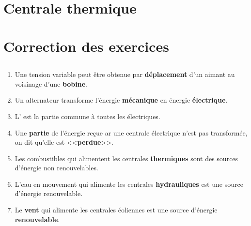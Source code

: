 \documentclass[12pt,a4paper]{article}
\begin{document}
\section{Centrale thermique}








\begin{myexos}
\end{myexos}
\appendix

\newpage

\section*{Correction des exercices}

\subsection*{}

\begin{enumerate}[label=\arabic*.]
	\item Une tension variable peut être obtenue par \textbf{déplacement} d'un aimant au voisinage d'une \textbf{bobine}.
	\item Un alternateur transforme l'énergie \textbf{mécanique} en énergie \textbf{électrique}.
	\item L' est la partie commune à toutes les  électriques.
	\item Une \textbf{partie} de l'énergie reçue ar une centrale électrique n'est pas transformée, on dit qu'elle est <<\textbf{perdue}>>.
	\item Les combustibles qui alimentent les centrales \textbf{thermiques} sont des sources d'énergie non renouvelables.
	\item L'eau en mouvement qui alimente les centrales \textbf{hydrauliques} est une source d'énergie renouvelable.
	\item Le \textbf{vent} qui alimente les centrales éoliennes est une source d'énergie \textbf{renouvelable}.
\end{enumerate}

\subsection*{}
\end{document}
